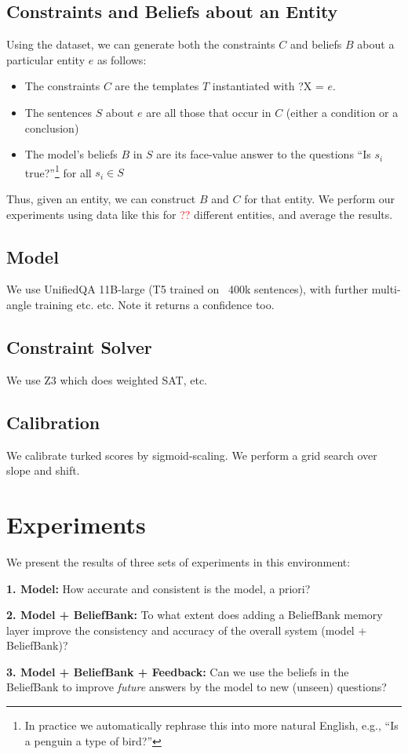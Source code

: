 \documentclass[11pt]{article}
\newcommand{\red}[1]{\textcolor{red}{#1}}
\newenvironment{ite}{                     %
     \parskip 0cm \begin{itemize} \parskip 0cm \parsep 0cm \itemsep 0cm \topsep 0cm}{
        \end{itemize}} %
\newenvironment{enu}{                   %
     \parskip 0cm \begin{list}{}{\parsep 0cm \itemsep 0cm \topsep 0cm}}{
       \end{list}} %
\begin{document}
\subsection{Constraints and Beliefs about an Entity}

Using the dataset, we can generate both the constraints $C$ and beliefs $B$ about a particular entity $e$ as follows:
\begin{ite}
\item The constraints $C$ are the templates $T$ instantiated with ?X = $e$.
\item The sentences $S$ about $e$ are all those that occur in $C$ (either a condition or a conclusion)
\item The model's beliefs $B$ in $S$ are its face-value answer to the questions ``Is $s_i$ true?''\footnote{In practice we automatically rephrase this into more natural English, e.g., ``Is a penguin a type of bird?''} for all $s_i \in S$
\end{ite}
Thus, given an entity, we can construct $B$ and $C$ for that entity. 
We perform our experiments using data like this for \red{??} different entities,
and average the results.

\subsection{Model}

We use UnifiedQA 11B-large (T5 trained on ~400k sentences), with further multi-angle training etc. etc.
Note it returns a confidence too.

\subsection{Constraint Solver}

We use Z3 which does weighted SAT, etc.

\subsection{Calibration \label{calibration}}

We calibrate turked scores by sigmoid-scaling. We perform a grid search over slope and shift.

\section{Experiments}

We present the results of three sets of experiments in this environment:
\begin{enu}
\item[{\bf 1. Model:}] How accurate and consistent is the model, a priori?
\item[{\bf 2. Model + BeliefBank:}] To what extent does adding a BeliefBank memory layer improve the consistency and accuracy
           of the overall system (model + BeliefBank)?
\item[{\bf 3. Model + BeliefBank + Feedback:}] Can we use the beliefs in the BeliefBank to improve {\it future} answers by the model
to new (unseen) questions?
\end{enu}
\end{document}

